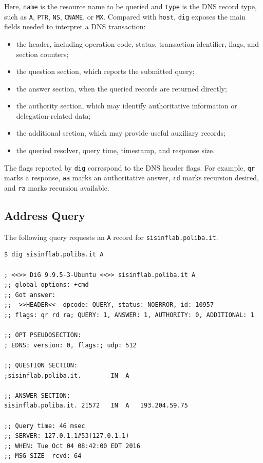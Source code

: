 \documentclass{scrbook}
\begin{document}
	Here, \texttt{name} is the resource name to be queried and \texttt{type} is the DNS record type, such as \texttt{A}, \texttt{PTR}, \texttt{NS}, \texttt{CNAME}, or \texttt{MX}. Compared with \texttt{host}, \texttt{dig} exposes the main fields needed to interpret a DNS transaction:
	\begin{itemize}
	    \item the header, including operation code, status, transaction identifier, flags, and section counters;
	    \item the question section, which reports the submitted query;
	    \item the answer section, when the queried records are returned directly;
	    \item the authority section, which may identify authoritative information or delegation-related data;
	    \item the additional section, which may provide useful auxiliary records;
	    \item the queried resolver, query time, timestamp, and response size.
	\end{itemize}
	
	The flags reported by \texttt{dig} correspond to the DNS header flags. For example, \texttt{qr} marks a response, \texttt{aa} marks an authoritative answer, \texttt{rd} marks recursion desired, and \texttt{ra} marks recursion available.
	
	\subsection{Address Query}
	
	The following query requests an \texttt{A} record for \texttt{sisinflab.poliba.it}.
	
	\begin{lstlisting}
$ dig sisinflab.poliba.it A

; <<>> DiG 9.9.5-3-Ubuntu <<>> sisinflab.poliba.it A
;; global options: +cmd
;; Got answer:
;; ->>HEADER<<- opcode: QUERY, status: NOERROR, id: 10957
;; flags: qr rd ra; QUERY: 1, ANSWER: 1, AUTHORITY: 0, ADDITIONAL: 1

;; OPT PSEUDOSECTION:
; EDNS: version: 0, flags:; udp: 512

;; QUESTION SECTION:
;sisinflab.poliba.it.        IN  A

;; ANSWER SECTION:
sisinflab.poliba.it. 21572   IN  A   193.204.59.75

;; Query time: 46 msec
;; SERVER: 127.0.1.1#53(127.0.1.1)
;; WHEN: Tue Oct 04 08:42:00 EDT 2016
;; MSG SIZE  rcvd: 64
	\end{lstlisting}
	
\end{document}
